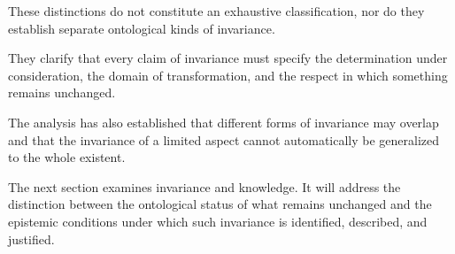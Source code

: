 These distinctions do not
constitute an exhaustive
classification, nor do they
establish separate ontological
kinds of invariance.

They clarify that every claim
of invariance must specify
the determination under
consideration, the domain
of transformation, and the
respect in which something
remains unchanged.

The analysis has also established
that different forms of invariance
may overlap and that the
invariance of a limited aspect
cannot automatically be
generalized to the whole existent.

The next section examines
invariance and knowledge.
It will address the distinction
between the ontological status
of what remains unchanged
and the epistemic conditions
under which such invariance
is identified, described,
and justified.

